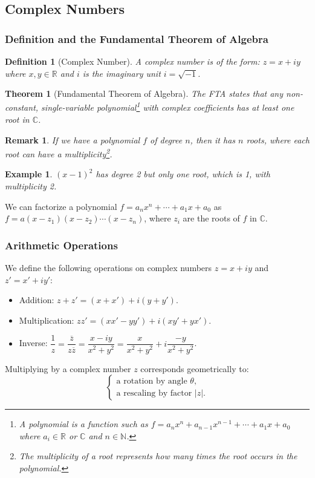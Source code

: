 \documentclass{article}
\newtheorem{theorem}{Theorem}
\newtheorem{definition}{Definition}
\newtheorem*{example}{Example}
\newtheorem{remark}{Remark}
\begin{document}
\subsection{Complex Numbers}

\subsubsection{Definition and the Fundamental Theorem of Algebra}
\begin{definition}[Complex Number]
    A complex number is of the form: \(z = x + iy\) where \(x,y \in \mathbb{R}\) and \(i\) is the imaginary unit \(i = \sqrt{-1}\).
\end{definition}
\begin{theorem}[Fundamental Theorem of Algebra]
    The FTA states that any non-constant, single-variable polynomial\footnote{A polynomial is a function such as $f = a_n x^n + a_{n-1}x^{n-1} + \cdots + a_1 x + a_0$ where $a_i \in \mathbb{R}$ or $\mathbb{C}$ and $n \in \mathbb{N}$.} with complex coefficients has at least one root in $\mathbb{C}$.
\end{theorem}
\begin{remark}
    If we have a polynomial $f$ of degree $n$, then it has $n$ roots, where each root can have a multiplicity\footnote{The multiplicity of a root represents how many times the root occurs in the polynomial.}.
\end{remark}
\begin{example}
    $(x-1)^2$ has degree 2 but only one root, which is 1, with multiplicity 2.
\end{example}
We can factorize a polynomial $f = a_n x^n + \cdots + a_1 x + a_0$ as $f = a(x - z_1)(x - z_2)\cdots(x - z_n)$, where $z_i$ are the roots of $f$ in $\mathbb{C}$.

\subsubsection{Arithmetic Operations}
\label{subsec:CO}
We define the following operations on complex numbers $z = x+iy$ and $z' = x'+iy'$:
\begin{itemize}
    \item Addition: \(z + z' = (x + x') + i(y + y')\).
    \item Multiplication: \(zz' = (xx' - yy') + i(xy' + yx')\).
    \item Inverse: \(\dfrac{1}{z} = \dfrac{\overline{z}}{z\overline{z}} = \dfrac{x - iy}{x^2 + y^2} = \dfrac{x}{x^2 + y^2} + i\dfrac{-y}{x^2 + y^2}\).
\end{itemize}
Multiplying by a complex number $z$ corresponds geometrically to:
\[\begin{cases}\text{a rotation by angle } \theta,\\\text{a rescaling by factor } |z|.\end{cases}\]
\end{document}
